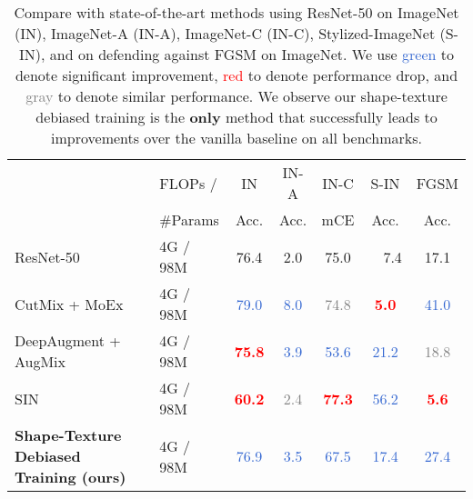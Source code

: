 \documentclass{article} \usepackage{iclr2021_conference,times}
\begin{document}
\begin{table}[t]
\renewcommand\arraystretch{0.8}
\small
\centering
\begin{tabular}{l|Hccccc}
\toprule
         & FLOPs / & \scshape{IN} & \scshape{IN-A} & \scshape{IN-C} & \scshape{S-IN} & \scshape{FGSM} \\ 
& \#Params & {\footnotesize Acc. \color{red}} & {\footnotesize Acc. \color{red}} & {\footnotesize mCE \color{red}} & {\footnotesize Acc. \color{red}} & {\footnotesize Acc. \color{red}} \\
\midrule
ResNet-50     &  4G / 98M &    76.4 & 2.0      &   75.0         &      ~~7.4             &   17.1   \\
\midrule
CutMix + MoEx~\citep{li2020feature}       & 4G / 98M &  \textcolor{Highlight}{79.0}  &   \textcolor{Highlight}{8.0}      &    \textcolor{gray}{74.8}         &       \textbf{\textcolor{red}{5.0}}             &   \textcolor{Highlight}{41.0}    \\
DeepAugment + AugMix \citep{hendrycks2020many}       & 4G / 98M &  \textbf{\textcolor{red}{75.8}}  &   \textcolor{Highlight}{3.9}      &    \textcolor{Highlight}{53.6}         &       \textcolor{Highlight}{21.2}             &   \textcolor{gray}{18.8}    \\
SIN~\citep{geirhos2018imagenettrained}       & 4G / 98M &  \textbf{\textcolor{red}{60.2}}  &   \textcolor{gray}{2.4}      &    \textbf{\textcolor{red}{77.3}}         &       \textcolor{Highlight}{56.2}             &   \textbf{\textcolor{red}{5.6}}    \\
\textbf{Shape-Texture Debiased Training (ours)}       & 4G / 98M &  \textcolor{Highlight}{76.9}  &   \textcolor{Highlight}{3.5}      &    \textcolor{Highlight}{67.5}         &       \textcolor{Highlight}{17.4}             &   \textcolor{Highlight}{27.4}    \\

\bottomrule
\end{tabular}
\vspace{-0.9em}
\caption{Compare with state-of-the-art methods using ResNet-50 on ImageNet (IN), ImageNet-A (IN-A), ImageNet-C (IN-C), Stylized-ImageNet (S-IN), and on defending against FGSM on ImageNet. We use \textcolor{Highlight}{green} to denote significant improvement, \textcolor{red}{red} to denote performance drop, and \textcolor{gray}{gray} to denote similar performance. We observe our shape-texture debiased training is the \textbf{only} method that successfully leads to improvements over the vanilla baseline on all benchmarks.}
\vspace{-0.5em}
\label{tab:compare_sota}
\end{table}
\end{document}
